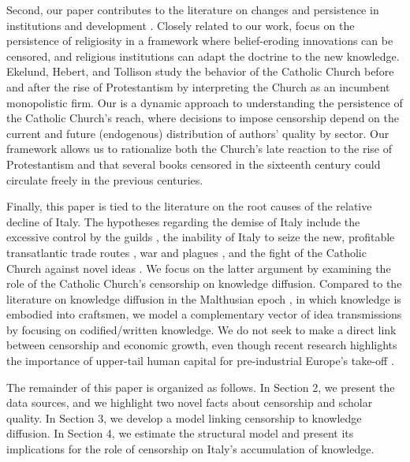 Second, our paper contributes to the literature on changes and persistence in institutions and development \cite{acemoglu2005institutions,henriques2019comparative,johnson2019persecution}. Closely related to our work,  focus on the persistence of religiosity in a framework where belief-eroding innovations can be censored, and religious institutions can adapt the doctrine to the new knowledge. Ekelund, Hebert, and Tollison \citeyear{ekelund2002,ekelund2004} study the behavior of the Catholic Church before and after the rise of Protestantism by interpreting the Church as an incumbent monopolistic firm. Our is a dynamic approach to understanding the persistence of the Catholic Church's reach, where decisions to impose censorship depend on the current and future (endogenous) distribution of authors' quality by sector. Our framework allows us to rationalize  both the Church's late reaction to the rise of Protestantism and that several books censored in the sixteenth century could circulate freely in the previous centuries.

Finally, this paper is tied to the literature on the root causes of the relative decline of Italy. The hypotheses regarding the demise of Italy include the excessive control by the guilds \cite{cipolla2004}, the inability of Italy to seize the new, profitable transatlantic trade routes \cite{land99,braudel2018}, war and plagues \cite{alfani13,alfani2013calamities}, and the fight of the Catholic Church against novel ideas \cite{land99,gusdorf1971}. We focus on the latter argument by examining the role of the Catholic Church's censorship on knowledge diffusion. Compared to the literature on knowledge diffusion in the Malthusian epoch \cite{de2017clans}, in which knowledge is embodied into craftsmen, we model a complementary vector of idea transmissions by focusing on codified/written knowledge. We do not seek to make a direct link between censorship and economic growth, even though recent research highlights the importance of upper-tail human capital for pre-industrial Europe's take-off \cite{squicciarini2015,cantoni2014,mokyr2012,mokyr2016}.

The remainder of this paper is organized as follows.  In Section 2, we present the data sources, and we highlight two novel facts about censorship and scholar quality. In Section 3, we develop a model linking censorship to knowledge diffusion.  In Section 4, we estimate the structural model and present its implications for the role of censorship on Italy's accumulation of knowledge. %
